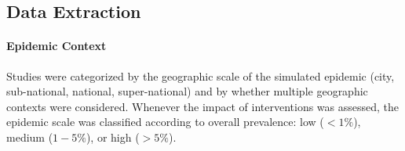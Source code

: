 \subsection{Data Extraction}
\label{ss:meth:data}
\paragraph{Epidemic Context}
Studies were categorized by the geographic scale of the simulated epidemic
(city, sub-national, national, super-national)   %
and by whether multiple geographic contexts were considered.
Whenever the impact of interventions was assessed,  %
the epidemic scale was classified according to overall \hiv prevalence:
low ($<1\%$), medium ($1-5\%$), or high ($>5\%$).
